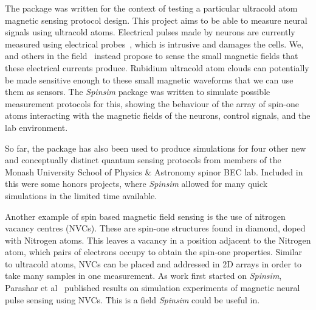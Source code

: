 \documentclass{jors}
\begin{document}
		The package was written for the context of testing a particular ultracold atom magnetic sensing protocol design.
		This project aims to be able to measure neural signals using ultracold atoms.
		Electrical pulses made by neurons are currently measured using electrical probes~\cite{mitterdorfer_potassium_2002}, which is intrusive and damages the cells.
		We, and others in the field~\cite{barry_optical_2016, xu_wavelet-based_2016, parashar_axon_2020, webb_high_2021} instead propose to sense the small magnetic fields that these electrical currents produce.
		Rubidium ultracold atom clouds can potentially be made sensitive enough to these small magnetic waveforms that we can use them as sensors.
		The \emph{Spinsim} package was written to simulate possible measurement protocols for this, showing the behaviour of the array of spin-one atoms interacting with the magnetic fields of the neurons, control signals, and the lab environment.

		So far, the package has also been used to produce simulations for four other new and conceptually distinct quantum sensing protocols from members of the Monash University School of Physics \& Astronomy spinor BEC lab.
		Included in this were some honors projects, where \emph{Spinsim} allowed for many quick simulations in the limited time available. %

		Another example of spin based magnetic field sensing is the use of nitrogen vacancy centres (NVCs).
		These are spin-one structures found in diamond, doped with Nitrogen atoms.
		This leaves a vacancy in a position adjacent to the Nitrogen atom, which pairs of electrons occupy to obtain the spin-one properties.
		Similar to ultracold atoms, NVCs can be placed and addressed in 2D arrays in order to take many samples in one measurement.
		As work first started on \emph{Spinsim}, Parashar et al~\cite{parashar_axon_2020} published results on simulation experiments of magnetic neural pulse sensing using NVCs.
		This is a field \emph{Spinsim} could be useful in.
\end{document}
